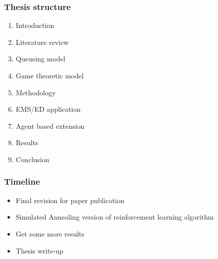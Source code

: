 \begin{frame}
    \frametitle{Thesis structure}

    \begin{enumerate}
        \item Introduction
        \item Literature review
        \item Queueing model
        \item Game theoretic model
        \item Methodology
        \item EMS/ED application
        \item Agent based extension
        \item Results
        \item Conclusion
    \end{enumerate}

\end{frame}


\begin{frame}
    \frametitle{Timeline}

    \begin{itemize}
        \item Final revision for paper publication
        \item Simulated Annealing version of reinforcement learning algorithm
        \item Get some more results
        \item Thesis write-up
    \end{itemize}

\end{frame}